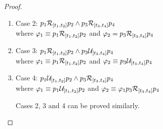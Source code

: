 \begin{proof}
\begin{enumerate}
        \item Case 2: $p_1 \release_{[t_1, t_2]} p_2 \land p_3 \release_{[t_3, t_4]} p_4$\\
        where $\varphi_1 \equiv p_1 \release_{[t_1, t_2]} p_2$ and $\varphi_2=p_3 \release_{[t_3, t_4]} p_4$

        \item Case 3: $p_1 \release_{[t_1, t_2]} p_2 \land p_3 \until_{[t_3, t_4]} p_4$\\
        where $\varphi_1 \equiv p_1 \release_{[t_1, t_2]} p_2$ and $\varphi_2\equiv  p_3 \until_{[t_3, t_4]} p_4$

        \item Case 4: $p_1 \until_{[t_1, t_2]} p_2 \land p_3 \release_{[t_3, t_4]} p_4$\\
        where  $\varphi_1 \equiv p_1 \until_{[t_1, t_2]} p_2$ and $\varphi_2\equiv \varphi_1  p_3 \release_{[t_3, t_4]} p_4$

        Cases 2, 3 and 4 can be proved similarly.
    \end{enumerate}

      
\end{proof}
























